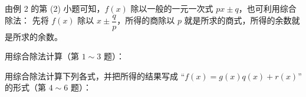 由例 2 的第 (2) 小题可知，$f(x)$ 除以一般的一元一次式 $px \pm q$，也可利用综合除法：
先将 $f(x)$ 除以 $x \pm \dfrac{q}{p}$，所得的商除以 $p$ 就是所求的商式，所得的余数就是所求的余数。



\lianxi
\begin{xiaotis}

用综合除法计算（第 $1 \sim 3$ 题）：




用综合除法计算下列各式，并把所得的结果写成 “$f(x) = g(x)q(x) + r(x)$” 的形式（第 $4 \sim 6$ 题）：




\end{xiaotis}


